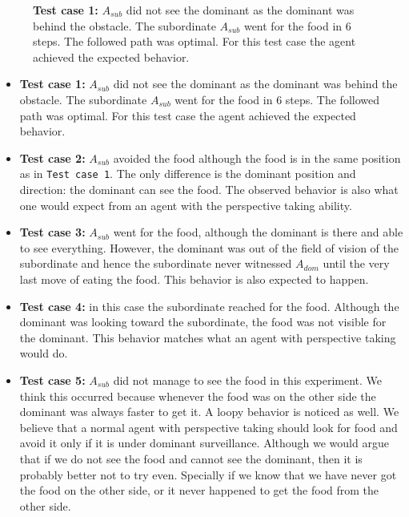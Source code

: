\documentclass{article}
\begin{document}
\begin{figure}
    \centering
    \caption{\textbf {Test  case 1:} \(A_{sub}\) did not see the dominant as the dominant was behind the obstacle. The subordinate \(A_{sub}\) went for the food in 6 steps. The followed path was optimal.  For this test case the agent achieved the expected behavior.}
    \label{fig.tc.1}
\end{figure}
\begin{itemize}
    \item \textbf {Test  case 1:} \(A_{sub}\) did not see the dominant as the dominant was behind the obstacle. The subordinate \(A_{sub}\) went for the food in 6 steps. The followed path was optimal.  For this test case the agent achieved the expected behavior.
    \item \textbf {Test  case 2:} \(A_{sub}\) avoided the food although the food is in the same position as in \texttt{Test case 1}. The only difference is the dominant position and direction: the dominant can see the food. The observed behavior is also what one would expect from an agent with the perspective taking ability.
    \item \textbf {Test  case 3:} \(A_{sub}\) went for the food, although the dominant is there and able to see everything. However, the dominant was out of the field of vision of the subordinate and hence the subordinate never witnessed \(A_{dom}\) until the very last move of eating the food. This behavior is also expected to happen.
    \item \textbf {Test  case 4:} in this case the subordinate reached for the food. Although the dominant was looking toward the subordinate, the food was not visible for the dominant. This behavior matches what an agent with perspective taking would do.
    \item \textbf {Test  case 5:} \(A_{sub}\) did not manage to see the food in this experiment. We think this occurred because whenever the food was on the other side the dominant was always faster to get it. A loopy behavior is noticed as well. We believe that a normal agent with perspective taking should look for food and avoid it only if it is under dominant surveillance. Although we would argue that if we do not see the food and cannot see the dominant, then it is probably better not to try even. Specially if we know that we have never got the food on the other side, or it never happened to get the food from the other side.

\end{itemize}
\end{document}
